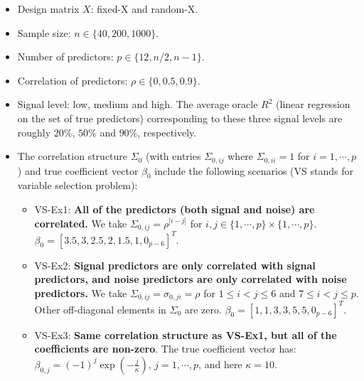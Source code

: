 \documentclass{article}
\begin{document}
\begin{itemize}
  \item Design matrix $X$: fixed-X and random-X.
  \item Sample size: $n \in \{40, 200, 1000\}$.
  \item Number of predictors: $p \in \{12, n/2, n-1\}$.
  \item Correlation of predictors: $\rho \in \{0,0.5,0.9\}$.
  \item Signal level: low, medium and high. The average oracle $R^2$ (linear regression on the set of true predictors) corresponding to these three signal levels are roughly $20\%$, $50\%$ and $90\%$, respectively.
  \item The correlation structure $\Sigma_0$ (with entries $\Sigma_{0,ij}$ where $\Sigma_{0,ii}=1$ for $i=1,\cdots,p$) and true coefficient vector $\beta_0$ include the following scenarios (VS stands for variable selection problem):
  \begin{itemize}
    \item VS-Ex1: \textbf{All of the predictors (both signal and noise) are correlated.} We take $\Sigma_{0,ij}=\rho^{|i-j|}$ for $i,j\in\{1,\cdots,p\}\times\{1,\cdots,p\}$. $\beta_0=[3.5,3,2.5,2,1.5,1,0_{p-6}]^T$. 
    \item VS-Ex2: \textbf{Signal predictors are only correlated with signal predictors, and noise predictors are only correlated with noise predictors.} We take $\Sigma_{0,ij}=\sigma_{0,ji}=\rho$ for $1\le i <j \le 6$ and $7\le i <j \le p$. Other off-diagonal elements in $\Sigma_0$ are zero. $\beta_0=[1,1,3,3,5,5,0_{p-6}]^T$.
    \item VS-Ex3: \textbf{Same correlation structure as VS-Ex1, but all of the coefficients are non-zero}. The true coefficient vector has: $\beta_{0,j} = \displaystyle (-1)^j \exp(-\frac{j}{\kappa})$, $j=1,\cdots,p$, and here $\kappa=10$.
  \end{itemize}
\end{itemize}
\end{document}
